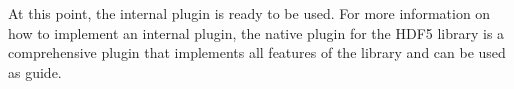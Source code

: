 At this point, the internal plugin is ready to be used. For more
information on how to implement an internal plugin, the native plugin
for the HDF5 library is a comprehensive plugin that implements all
features of the library and can be used as guide.

